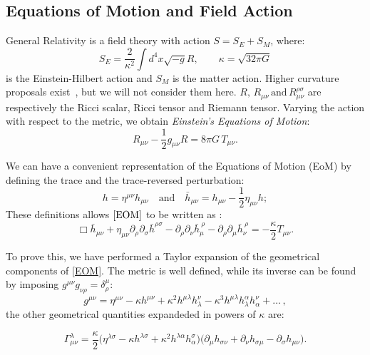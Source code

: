 \documentclass[12pt,a4paper,oneside]{article}
\numberwithin{equation}{section}   %
\begin{document}
\subsection{Equations of Motion and Field Action}
General Relativity is a field theory with action $S = S_E +S_M$, where:
\begin{equation}
    S_E = \frac{2}{\kappa^2}\int d^4x \sqrt{-g} R, \qquad \kappa =\sqrt{32\pi G}
\end{equation}
is the Einstein-Hilbert action and $S_M$ is the matter action. Higher curvature 
proposals exist~\cite{Stelle1978}, but we will not consider them here. $R, \, R_{\mu\nu} \,\text{and}\,
R_{\mu\nu}^{\rho\sigma}$ are respectively the Ricci scalar, Ricci tensor and Riemann tensor. 
Varying the action with respect to the metric, we obtain \textit{Einstein's Equations of Motion}:
\begin{equation}
R_{\mu\nu} - \frac{1}{2}g_{\mu\nu}R = 8\pi G\, T_{\mu\nu}.\label{EOM}
\end{equation}

We can have a convenient representation of the Equations of Motion (EoM)
 by defining the trace and the 
trace-reversed perturbation:
\begin{equation}
h = \eta^{\mu\nu} h_{\mu\nu} \quad\text{and} \quad \bar{h}_{\mu\nu}=h_{\mu\nu}-\frac12\eta_{\mu\nu}h;
\end{equation}
These definitions allows $\eqref{EOM}$ to be written as \cite{Maggiore2008}:
\begin{equation}\boxed{ 
\Box \bar{h}_{\mu\nu}
+
\eta_{\mu\nu}\partial_\rho\partial_\sigma
\bar{h}^{\rho\sigma}
-
\partial_\rho\partial_\nu \bar{h}_\mu^{\ \rho}
-
\partial_\rho\partial_\mu \bar{h}_\nu^{\ \rho}
=
-\frac{\kappa}{2}T_{\mu\nu}.
}\label{LEOM}\end{equation}

To prove this, we have performed a Taylor expansion of the geometrical components of 
\eqref{EOM}. The metric is well defined, while its inverse can be found by imposing 
$g^{\mu\nu}g_{\nu\rho}=\delta^\mu_\rho$:
\begin{equation}
g^{\mu\nu} = \eta^{\mu\nu} - \kappa h^{\mu\nu} + \kappa^2 h^{\mu\lambda}h^\nu_\lambda - \kappa^3 h^{\mu\lambda}h_\lambda^\alpha h_\alpha^\nu + \dots\,,
\end{equation}
the other geometrical quantities expandeded
in powers of $\kappa$ are:


\begin{equation}
\Gamma^\lambda_{\mu\nu} = \frac{\kappa}{2}\bigl(\eta^{\lambda\sigma} - \kappa h^{\lambda\sigma} + \kappa^2 h^{\lambda\alpha}h_\alpha^\sigma\bigr)\bigl(\partial_\mu h_{\sigma\nu} + \partial_\nu h_{\sigma\mu} - \partial_\sigma h_{\mu\nu}\bigr).
\end{equation}
\end{document}
